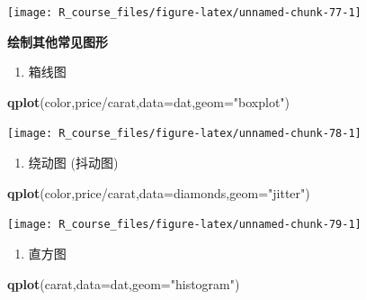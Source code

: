 \documentclass[]{article}
\newenvironment{Shaded}{\begin{snugshade}}{\end{snugshade}}
\newcommand{\KeywordTok}[1]{\textcolor[rgb]{0.13,0.29,0.53}{\textbf{{#1}}}}
\newcommand{\DataTypeTok}[1]{\textcolor[rgb]{0.13,0.29,0.53}{{#1}}}
\newcommand{\StringTok}[1]{\textcolor[rgb]{0.31,0.60,0.02}{{#1}}}
\newcommand{\NormalTok}[1]{{#1}}
\providecommand{\tightlist}{%
  \setlength{\itemsep}{0pt}\setlength{\parskip}{0pt}}
\numberwithin{figure}{section}
\numberwithin{table}{section}
\theoremstyle{definition}
\theoremstyle{definition}
\theoremstyle{definition}
\theoremstyle{remark}
\begin{document}
\begin{center}\texttt{[image: R\_course\_files/figure-latex/unnamed-chunk-77-1]} \end{center}

\textbf{绘制其他常见图形}

\begin{enumerate}
\def\labelenumi{\arabic{enumi}.}
\tightlist
\item
  箱线图
\end{enumerate}

\begin{Shaded}
\begin{Highlighting}[]
\KeywordTok{qplot}\NormalTok{(color,price/carat,}\DataTypeTok{data=}\NormalTok{dat,}\DataTypeTok{geom=}\StringTok{"boxplot"}\NormalTok{)}
\end{Highlighting}
\end{Shaded}

\begin{center}\texttt{[image: R\_course\_files/figure-latex/unnamed-chunk-78-1]} \end{center}

\begin{enumerate}
\def\labelenumi{\arabic{enumi}.}
\setcounter{enumi}{1}
\tightlist
\item
  绕动图 (抖动图)
\end{enumerate}

\begin{Shaded}
\begin{Highlighting}[]
\KeywordTok{qplot}\NormalTok{(color,price/carat,}\DataTypeTok{data=}\NormalTok{diamonds,}\DataTypeTok{geom=}\StringTok{"jitter"}\NormalTok{)}
\end{Highlighting}
\end{Shaded}

\begin{center}\texttt{[image: R\_course\_files/figure-latex/unnamed-chunk-79-1]} \end{center}

\begin{enumerate}
\def\labelenumi{\arabic{enumi}.}
\setcounter{enumi}{2}
\tightlist
\item
  直方图
\end{enumerate}

\begin{Shaded}
\begin{Highlighting}[]
\KeywordTok{qplot}\NormalTok{(carat,}\DataTypeTok{data=}\NormalTok{dat,}\DataTypeTok{geom=}\StringTok{"histogram"}\NormalTok{)}
\end{Highlighting}
\end{Shaded}
\end{document}
